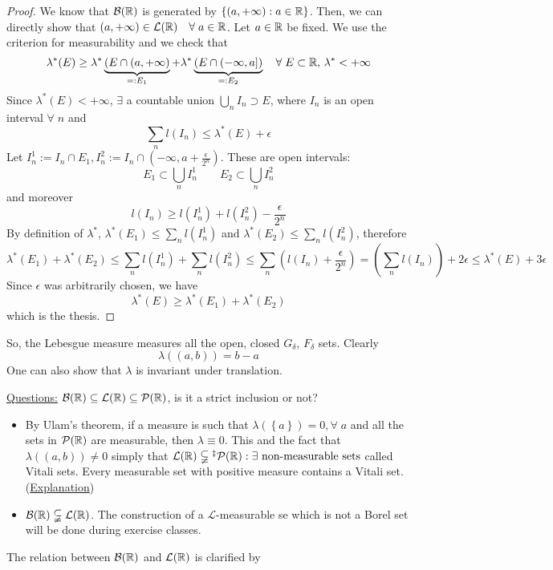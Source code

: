 \begin{proof}
    We know that \(\mathcal{B}(\mathbb{R})\) is generated by \(\left\lbrace (a, +\infty) : a \in \mathbb{R} \right\rbrace\). Then, we can directly show that \((a, +\infty) \in \mathcal{L}(\mathbb{R}) \quad \forall \; a \in \mathbb{R}\). Let \(a \in \mathbb{R}\) be fixed. We use the criterion for measurability and we check that 
    \[
        \lambda^* (E) \geq \lambda^*\underbrace{(E \cap (a, +\infty)}_{=: E_1} + \lambda^*\underbrace{(E \cap (-\infty, a])}_{=:E_2} \quad \forall\; E \subset \mathbb{R}, \, \lambda^* < +\infty
    \]
    Since \(\lambda^*(E) < +\infty\), \(\exists\) a countable union \(\bigcup_n I_n \supset E\), where \(I_n\) is an open interval \(\forall \; n\) and 
    \[
        \sum_n l(I_n) \leq \lambda^*(E) + \epsilon
    \]
    Let \(I^1_n := I_n \cap E_1, I^2_n := I_n \cap (-\infty, a + \frac{\epsilon}{2^n})\). These are open intervals:
    \[
        E_1 \subset \bigcup_n I^1_n \qquad E_2 \subset \bigcup_n I^2_n
    \tag*{countable unions}\]
    and moreover 
    \[
        l(I_n) \geq l(I^1_n) + l(I^2_n) - \frac{\epsilon}{2^n}
    \]
    By definition of \(\lambda^*\), \(\lambda^*(E_1) \leq \sum_n l(I^1_n)\) and \(\lambda^* (E_2) \leq \sum_n l(I^2_n)\), therefore 
    \[
        \lambda^*(E_1) + \lambda^*(E_2) \leq \sum_n l(I^1_n) + \sum_n l(I^2_n) \leq \sum_n \left(l(I_n) +\frac{\epsilon}{2^n}\right) = \left(\sum_n l(I_n)\right) + 2\epsilon \leq \lambda^*(E) + 3\epsilon
    \]
    Since \(\epsilon\) was arbitrarily chosen, we have
    \[
        \lambda^*(E) \geq \lambda^*(E_1) + \lambda^*(E_2)
    \]  
    which is the thesis.
\end{proof}
So, the Lebesgue measure measures all the open, closed \(G_{\delta}\), \(F_{\delta}\) sets. Clearly
\[
    \lambda((a,b)) = b-a
\]
One can also show that \(\lambda\) is invariant under translation. 

\noindent\underline{Questions:} \(\mathcal{B}(\mathbb{R}) \subseteq \mathcal{L}(\mathbb{R}) \subseteq \mathcal{P}(\mathbb{R})\), is it a strict inclusion or not?
\begin{itemize}
    \item By Ulam's theorem, if a measure is such that \(\lambda \left(\left\{ a \right\}\right) = 0, \forall \; a\) and all the sets in \(\mathcal{P}(\mathbb{R})\) are measurable, then \(\lambda \equiv 0\). This and the fact that \(\lambda\left(\left(a,b\right)\right) \not = 0\) simply that \(\mathcal{L}(\real) \subsetneqq\symbolfootnotemark[3]{I had no choice} \mathcal{P}(\real) : \exists \mbox{ non-measurable sets}\) called Vitali sets. Every measurable set with positive measure contains a Vitali set. (\href{https://math.stackexchange.com/questions/137949/the-construction-of-a-vitali-set}{Explanation})
    \item \(\mathcal{B}(\mathbb{R}) \subsetneqq \mathcal{L}(\mathbb{R})\). The construction of a \(\mathcal{L}\)-measurable se which is not a Borel set will be done during exercise classes.
\end{itemize}
The relation between \(\mathcal{B}(\mathbb{R})\) and \(\mathcal{L}(\mathbb{R})\) is clarified by 

